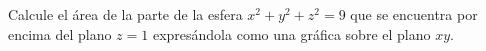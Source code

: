 Calcule el área de la parte de la esfera $x^2+y^2+z^2=9$ que se encuentra por encima del plano $z=1$ expresándola como una gráfica sobre el plano $xy$.
